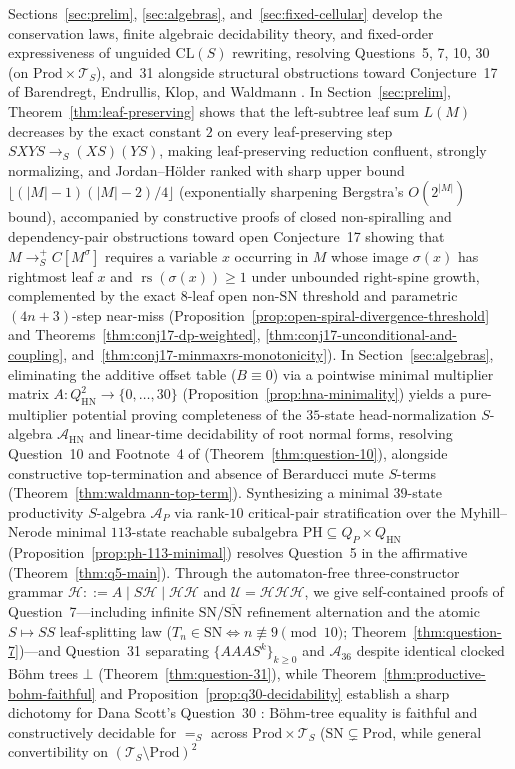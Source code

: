 \documentclass[11pt,reqno]{amsart}
\numberwithin{equation}{section}
\theoremstyle{plain}
\theoremstyle{definition}
\theoremstyle{remark}
\DeclareMathOperator{\rs}{rs}
\newcommand{\CLS}{\mathrm{CL}(S)}
\newcommand{\TS}{\mathcal{T}_S}
\newcommand{\SN}{\mathrm{SN}}
\newcommand{\HN}{\mathrm{HN}}
\newcommand{\Prod}{\mathrm{Prod}}
\newcommand{\redS}{\to_S}
\newcommand{\redSp}{\to_S^+}
\newcommand{\convS}{=_S}
\begin{document}
Sections~\ref{sec:prelim}, \ref{sec:algebras}, and~\ref{sec:fixed-cellular} develop the conservation laws, finite algebraic decidability theory, and fixed-order expressiveness of unguided $\CLS$ rewriting, resolving Questions~5, 7, 10, 30 (on $\Prod \times \TS$), and~31 alongside structural obstructions toward Conjecture~17 of Barendregt, Endrullis, Klop, and Waldmann \cite{BarendregtEndrullisKlopWaldmann2017}. In Section~\ref{sec:prelim}, Theorem~\ref{thm:leaf-preserving} shows that the left-subtree leaf sum $L(M)$ decreases by the exact constant $2$ on every leaf-preserving step $S X Y S \redS (X S)(Y S)$, making leaf-preserving reduction confluent, strongly normalizing, and Jordan--H\"older ranked with sharp upper bound $\lfloor(|M|-1)(|M|-2)/4\rfloor$ (exponentially sharpening Bergstra's $O(2^{|M|})$ bound), accompanied by constructive proofs of closed non-spiralling and dependency-pair obstructions toward open Conjecture~17 showing that $M \redSp C[M^\sigma]$ requires a variable $x$ occurring in $M$ whose image $\sigma(x)$ has rightmost leaf $x$ and $\rs(\sigma(x)) \ge 1$ under unbounded right-spine growth, complemented by the exact $8$-leaf open non-$\SN$ threshold and parametric $(4n+3)$-step near-miss (Proposition~\ref{prop:open-spiral-divergence-threshold} and Theorems~\ref{thm:conj17-dp-weighted}, \ref{thm:conj17-unconditional-and-coupling}, and~\ref{thm:conj17-minmaxrs-monotonicity}). In Section~\ref{sec:algebras}, eliminating the additive offset table ($B \equiv 0$) via a pointwise minimal multiplier matrix $A \colon Q_{\HN}^2 \to \{0,\dots,30\}$ (Proposition~\ref{prop:hna-minimality}) yields a pure-multiplier potential proving completeness of the $35$-state head-normalization $S$-algebra $\mathcal{A}_{\HN}$ and linear-time decidability of root normal forms, resolving Question~10 and Footnote~4 of \cite{BarendregtEndrullisKlopWaldmann2017} (Theorem~\ref{thm:question-10}), alongside constructive top-termination and absence of Berarducci mute $S$-terms \cite{BerarducciBohm1993,Berarducci1996} (Theorem~\ref{thm:waldmann-top-term}). Synthesizing a minimal $39$-state productivity $S$-algebra $\mathcal{A}_P$ via rank-$10$ critical-pair stratification over the Myhill--Nerode minimal $113$-state reachable subalgebra $\mathrm{PH} \subseteq Q_P \times Q_{\HN}$ (Proposition~\ref{prop:ph-113-minimal}) resolves Question~5 in the affirmative (Theorem~\ref{thm:q5-main}). Through the automaton-free three-constructor grammar $\mathcal{H} ::= A \mid S\mathcal{H} \mid \mathcal{H}\mathcal{H}$ and $\mathcal{U} = \mathcal{H}\mathcal{H}\mathcal{H}$, we give self-contained proofs of Question~7---including infinite $\SN/\overline{\SN}$ refinement alternation and the atomic $S \mapsto S S$ leaf-splitting law ($T_n \in \SN \iff n \not\equiv 9 \pmod{10}$; Theorem~\ref{thm:question-7})---and Question~31 separating $\{A A A S^k\}_{k \ge 0}$ and $\mathcal{A}_{36}$ despite identical clocked B\"ohm trees $\bot$ (Theorem~\ref{thm:question-31}), while Theorem~\ref{thm:productive-bohm-faithful} and Proposition~\ref{prop:q30-decidability} establish a sharp dichotomy for Dana Scott's Question~30 \cite{Scott1975}: B\"ohm-tree equality is faithful and constructively decidable for $\convS$ across $\Prod \times \TS$ ($\SN \subsetneq \Prod$, while general convertibility on $(\TS \setminus \Prod)^2$ 
\end{document}
